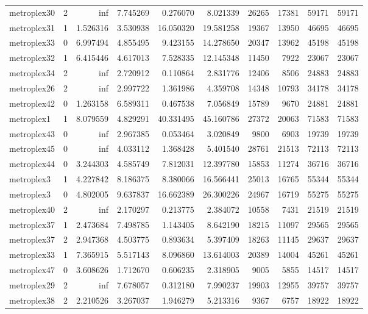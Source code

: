 \begin{longtable}{|l|r|r|r|r|r|r|r|r|r|}
metroplex30 & 2 & inf & 7.745269 & 0.276070 & 8.021339 & 26265 & 17381 & 59171 & 59171 \\
metroplex31 & 1 & 1.526316 & 3.530938 & 16.050320 & 19.581258 & 19367 & 13950 & 46695 & 46695 \\
metroplex33 & 0 & 6.997494 & 4.855495 & 9.423155 & 14.278650 & 20347 & 13962 & 45198 & 45198 \\
metroplex32 & 1 & 6.415446 & 4.617013 & 7.528335 & 12.145348 & 11450 & 7922 & 23067 & 23067 \\
metroplex34 & 2 & inf & 2.720912 & 0.110864 & 2.831776 & 12406 & 8506 & 24883 & 24883 \\
metroplex26 & 2 & inf & 2.997722 & 1.361986 & 4.359708 & 14348 & 10793 & 34178 & 34178 \\
metroplex42 & 0 & 1.263158 & 6.589311 & 0.467538 & 7.056849 & 15789 & 9670 & 24881 & 24881 \\
metroplex1 & 1 & 8.079559 & 4.829291 & 40.331495 & 45.160786 & 27372 & 20063 & 71583 & 71583 \\
metroplex43 & 0 & inf & 2.967385 & 0.053464 & 3.020849 & 9800 & 6903 & 19739 & 19739 \\
metroplex45 & 0 & inf & 4.033112 & 1.368428 & 5.401540 & 28761 & 21513 & 72113 & 72113 \\
metroplex44 & 0 & 3.244303 & 4.585749 & 7.812031 & 12.397780 & 15853 & 11274 & 36716 & 36716 \\
metroplex3 & 1 & 4.227842 & 8.186375 & 8.380066 & 16.566441 & 25013 & 16765 & 55344 & 55344 \\
metroplex3 & 0 & 4.802005 & 9.637837 & 16.662389 & 26.300226 & 24967 & 16719 & 55275 & 55275 \\
metroplex40 & 2 & inf & 2.170297 & 0.213775 & 2.384072 & 10558 & 7431 & 21519 & 21519 \\
metroplex37 & 1 & 2.473684 & 7.498785 & 1.143405 & 8.642190 & 18215 & 11097 & 29565 & 29565 \\
metroplex37 & 2 & 2.947368 & 4.503775 & 0.893634 & 5.397409 & 18263 & 11145 & 29637 & 29637 \\
metroplex33 & 1 & 7.365915 & 5.517143 & 8.096860 & 13.614003 & 20389 & 14004 & 45261 & 45261 \\
metroplex47 & 0 & 3.608626 & 1.712670 & 0.606235 & 2.318905 & 9005 & 5855 & 14517 & 14517 \\
metroplex29 & 2 & inf & 7.678057 & 0.312180 & 7.990237 & 19903 & 12955 & 39757 & 39757 \\
metroplex38 & 2 & 2.210526 & 3.267037 & 1.946279 & 5.213316 & 9367 & 6757 & 18922 & 18922 \\

\end{longtable}
